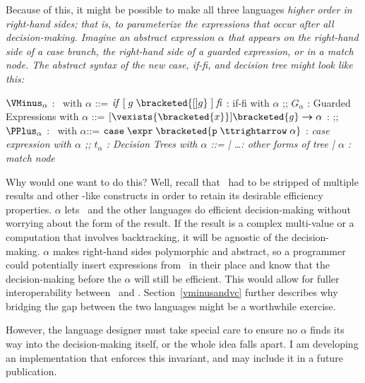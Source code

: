 \documentclass[manuscript,screen,review, 12pt, nonacm]{acmart}
\begin{document}
        Because of this, it might be possible to make all three languages
        \it{higher order} in right-hand sides; that is, to parameterize the
        expressions that occur \it{after} all decision-making. Imagine an
        abstract expression $\alpha$ that appears on the right-hand side of a
        \it{case} branch, the right-hand side of a guarded expression, or in a
        \it{match} node. The abstract syntax of the new \it{case}, \it{if-fi},
        and decision tree might look like this: 
        \begin{center}
            \begin{bnf}
                $\VMinus_{\alpha}$ : \VMinus\ with $\alpha$ ::=
                $\mathit{if}\; \mathit{[}\; g\; \bracketed{[] g}\; \mathit{]}\; \mathit{fi}$ : if-fi with $\alpha$
                ;;
                $G_{\alpha}$ : Guarded Expressions with $\alpha$ ::=
                $[\vexists{\bracketed{x}}] \bracketed{g} \boldsymbol{\rightarrow}\alpha$ : 
                ;;
                $\PPlus_{\alpha}$ : \PPlus\ with $\alpha$::=
                $\tt{case}\; \expr\; \bracketed{p\; \ttrightarrow\; \alpha}$ : \it{case} expression with $\alpha$ 
                ;;
                $t_{\alpha}$ : Decision Trees with $\alpha$ ::= 
                | \dots : other forms of tree 
                | $\alpha$ : match node 
            \end{bnf}
        \end{center}

        Why would one want to do this? Well, recall that \VMinus\ had to be
        stripped of multiple results and other \VC-like constructs in order to
        retain its desirable efficiency properties. $\alpha$ lets \VMinus\ and
        the other languages do efficient decision-making without worrying about
        the form of the result. If the result is a complex multi-value or a
        computation that involves backtracking, it will be agnostic of the
        decision-making. $\alpha$ makes right-hand sides polymorphic and
        abstract, so a programmer could potentially insert expressions from \VC\
        in their place and know that the decision-making before the $\alpha$
        will still be efficient. This would allow for fuller interoperability
        between \VC\ and \VMinus. Section~\ref{vminusandvc} further describes
        why bridging the gap between the two languages might be a worthwhile
        exercise. 

        However, the language designer must take special care to ensure no
        $\alpha$ finds its way into the decision-making itself, or the whole
        idea falls apart. I am developing an implementation that enforces this
        invariant, and may include it in a future publication. 
        
\end{document}
